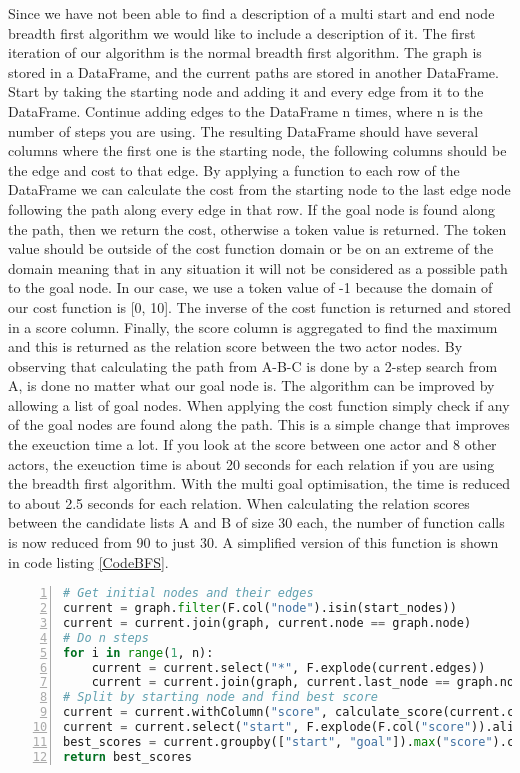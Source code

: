 Since we have not been able to find a description of a multi start and end node breadth first algorithm we would like to include a description of it. The first iteration of our algorithm is the normal breadth first algorithm. The graph is stored in a DataFrame, and the current paths are stored in another DataFrame. Start by taking the starting node and adding it and every edge from it to the DataFrame. Continue adding edges to the DataFrame n times, where n is the number of steps you are using. The resulting DataFrame should have several columns where the first one is the starting node, the following columns should be the edge and cost to that edge. By applying a function to each row of the DataFrame we can calculate the cost from the starting node to the last edge node following the path along every edge in that row. If the goal node is found along the path, then we return the cost, otherwise a token value is returned. The token value should be outside of the cost function domain or be on an extreme of the domain meaning that in any situation it will not be considered as a possible path to the goal node. In our case, we use a token value of -1 because the domain of our cost function is [0, 10]. The inverse of the cost function is returned and stored in a score column. Finally, the score column is aggregated to find the maximum and this is returned as the relation score between the two actor nodes. By observing that calculating the path from A-B-C is done by a 2-step search from A, is done no matter what our goal node is. The algorithm can be improved by allowing a list of goal nodes. When applying the cost function simply check if any of the goal nodes are found along the path. This is a simple change that improves the exeuction time a lot. If you look at the score between one actor and 8 other actors, the exeuction time is about 20 seconds for each relation if you are using the breadth first algorithm. With the multi goal optimisation, the time is reduced to about 2.5 seconds for each relation. When calculating the relation scores between the candidate lists A and B of size 30 each, the number of function calls is now reduced from 90 to just 30. A simplified version of this function is shown in code listing \ref{CodeBFS}.



\begin{lstlisting}[float=h, language=Python, caption=Simplified multi-start to multi-goal search algorithm, label=CodeBFS, numbers=left]
# Get initial nodes and their edges
current = graph.filter(F.col("node").isin(start_nodes))
current = current.join(graph, current.node == graph.node)
# Do n steps
for i in range(1, n):
    current = current.select("*", F.explode(current.edges))
    current = current.join(graph, current.last_node == graph.node)
# Split by starting node and find best score
current = current.withColumn("score", calculate_score(current.columns))
current = current.select("start", F.explode(F.col("score")).alias("goal", "score"))
best_scores = current.groupby(["start", "goal"]).max("score").collect()
return best_scores
\end{lstlisting}



